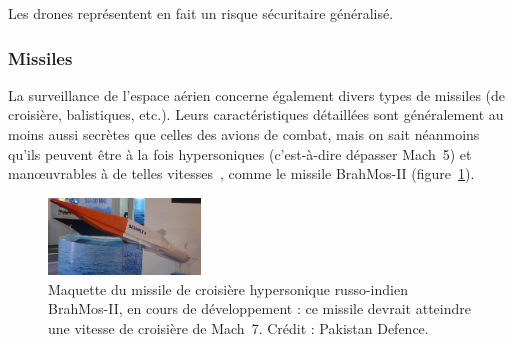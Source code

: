 	\addtocounter{footnote}{-1}
	
	\addtocounter{footnote}{1}

	Les drones représentent en fait un risque sécuritaire généralisé\footnotemark.	
	
	
	\subsubsection{Missiles}	
	La surveillance de l'espace aérien concerne également divers types de missiles (de croisière, balistiques, etc.). Leurs caractéristiques détaillées sont généralement au moins aussi secrètes que celles des avions de combat, mais on sait néanmoins qu'ils peuvent être à la fois hypersoniques (c'est-à-dire dépasser Mach~5) et manœuvrables à de telles vitesses~\cite{missiles}, comme le missile BrahMos-II (figure~\ref{fig:brahmos}).
	
	\begin{figure}
		\centering
		\includegraphics[width=0.36\textwidth]{figures/ch1/brahmos-II}
		\caption[Missile hypersonique BrahMos-II]{Maquette du missile de croisière hypersonique russo-indien BrahMos-II, en cours de développement : ce missile devrait atteindre une vitesse de croisière de Mach~7\footnotemark{}. Crédit : Pakistan Defence.}
		\label{fig:brahmos}
	\end{figure}
	
	

